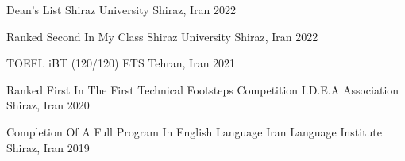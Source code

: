 {\begin{cvhonors}
  \cvhonor
    {Dean’s List} %
    {Shiraz University} %
    {Shiraz, Iran} %
    {2022} %
    
  \cvhonor
    {Ranked Second In My Class} %
    {Shiraz University} %
    {Shiraz, Iran} %
    {2022} %

  \cvhonor
    {TOEFL iBT (120/120)} %
    {ETS} %
    {Tehran, Iran} %
    {2021} %

  \cvhonor
    {Ranked First In The First Technical Footsteps Competition} %
    {I.D.E.A Association} %
    {Shiraz, Iran} %
    {2020} %

  \cvhonor
    {Completion Of A Full Program In English Language} %
    {Iran Language Institute} %
    {Shiraz, Iran} %
    {2019} %

\end{cvhonors}
}


